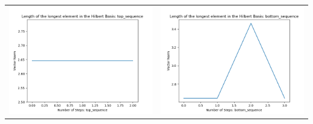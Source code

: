 \documentclass[10pt]{article}
\begin{document}
\begin{tabular}{c|c}
\begin{minipage}{.4\textwidth}
\includegraphics[width=\textwidth]{"DATA/5d/6 generators 1 bound G/top_sequence LENGTH"}
\end{minipage} &
\begin{minipage}{.4\textwidth}
\includegraphics[width=\textwidth]{"DATA/5d/6 generators 1 bound G bottomup/bottom_sequence LENGTH"}
\end{minipage}
\end{tabular}
\end{document}
